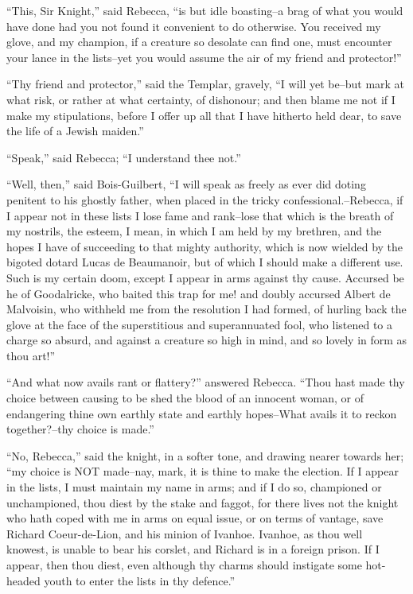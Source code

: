 ``This, Sir Knight,'' said Rebecca, ``is but idle boasting--a brag of
what you would have done had you not found it convenient to do
otherwise. You received my glove, and my champion, if a creature so
desolate can find one, must encounter your lance in the lists--yet you
would assume the air of my friend and protector!''

``Thy friend and protector,'' said the Templar, gravely, ``I will yet
be--but mark at what risk, or rather at what certainty, of dishonour;
and then blame me not if I make my stipulations, before I offer up all
that I have hitherto held dear, to save the life of a Jewish maiden.''

``Speak,'' said Rebecca; ``I understand thee not.''

``Well, then,'' said Bois-Guilbert, ``I will speak as freely as ever did
doting penitent to his ghostly father, when placed in the tricky
confessional.--Rebecca, if I appear not in these lists I lose fame and
rank--lose that which is the breath of my nostrils, the esteem, I mean,
in which I am held by my brethren, and the hopes I have of succeeding to
that mighty authority, which is now wielded by the bigoted dotard Lucas
de Beaumanoir, but of which I should make a different use. Such is my
certain doom, except I appear in arms against thy cause. Accursed be he
of Goodalricke, who baited this trap for me! and doubly accursed Albert
de Malvoisin, who withheld me from the resolution I had formed, of
hurling back the glove at the face of the superstitious and
superannuated fool, who listened to a charge so absurd, and against a
creature so high in mind, and so lovely in form as thou art!''

``And what now avails rant or flattery?'' answered Rebecca. ``Thou hast
made thy choice between causing to be shed the blood of an innocent
woman, or of endangering thine own earthly state and earthly hopes--What
avails it to reckon together?--thy choice is made.''

``No, Rebecca,'' said the knight, in a softer tone, and drawing nearer
towards her; ``my choice is NOT made--nay, mark, it is thine to make the
election. If I appear in the lists, I must maintain my name in arms; and
if I do so, championed or unchampioned, thou diest by the stake and
faggot, for there lives not the knight who hath coped with me in arms on
equal issue, or on terms of vantage, save Richard Coeur-de-Lion, and his
minion of Ivanhoe. Ivanhoe, as thou well knowest, is unable to bear his
corslet, and Richard is in a foreign prison. If I appear, then thou
diest, even although thy charms should instigate some hot-headed youth
to enter the lists in thy defence.''


